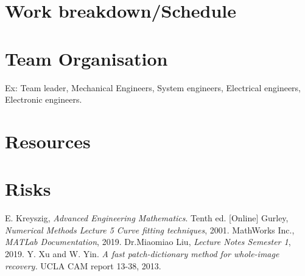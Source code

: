 \documentclass[a4paper]{article}
\begin{document}
\section{Work breakdown/Schedule}

\section{Team Organisation}
Ex: Team leader, Mechanical Engineers, System engineers, Electrical engineers, Electronic engineers.
\section {Resources}

\section{Risks}
\label{risks}

\begin{thebibliography}{9}
  E. Kreyszig,
  \emph{Advanced Engineering Mathematics}.
   Tenth ed. [Online]
  Gurley,
  \emph{Numerical Methods Lecture 5 Curve fitting techniques},
   2001.
  MathWorks Inc.,
  \emph{MATLab Documentation},
   2019.
  Dr.Miaomiao Liu,
  \emph{Lecture Notes Semester 1},
   2019.
Y. Xu and W. Yin. \emph{A fast patch-dictionary method for whole-image recovery.} UCLA CAM report 13-38, 2013.
\end{thebibliography}
\end{document}
